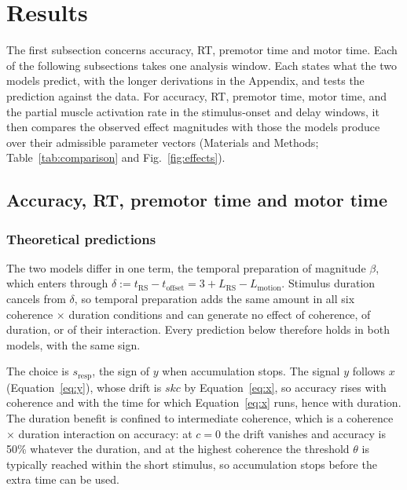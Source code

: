 \documentclass[a4paper,11pt]{article}
\theoremstyle{definition}
\newcommand{\1}{\mathbbm{1}}
\begin{document}
\section{Results}

The first subsection concerns accuracy, RT, premotor time and motor time. Each of the following subsections takes one analysis window. Each states what the two models predict, with the longer derivations in the Appendix, and tests the prediction against the data. For accuracy, RT, premotor time, motor time, and the partial muscle activation rate in the stimulus-onset and delay windows, it then compares the observed effect magnitudes with those the models produce over their admissible parameter vectors (Materials and Methods; Table~\ref{tab:comparison} and Fig.~\ref{fig:effects}).


\subsection{Accuracy, RT, premotor time and motor time}


\subsubsection{Theoretical predictions}

The two models differ in one term, the temporal preparation of magnitude $\beta$, which enters through $\delta:=t_{\mathrm{RS}}-t_{\mathrm{offset}}=3+L_{\mathrm{RS}}-L_{\mathrm{motion}}$. Stimulus duration cancels from $\delta$, so temporal preparation adds the same amount in all six coherence $\times$ duration conditions and can generate no effect of coherence, of duration, or of their interaction. Every prediction below therefore holds in both models, with the same sign.

The choice is $s_{\mathrm{resp}}$, the sign of $y$ when accumulation stops. The signal $y$ follows $x$ (Equation~\eqref{eq:y}), whose drift is $skc$ by Equation~\eqref{eq:x}, so accuracy rises with coherence and with the time for which Equation~\eqref{eq:x} runs, hence with duration. The duration benefit is confined to intermediate coherence, which is a coherence $\times$ duration interaction on accuracy: at $c=0$ the drift vanishes and accuracy is 50\% whatever the duration, and at the highest coherence the threshold $\theta$ is typically reached within the short stimulus, so accumulation stops before the extra time can be used.
\end{document}
